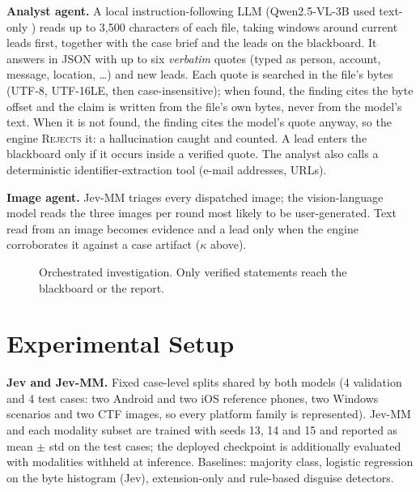 \documentclass[conference]{IEEEtran}
\newcommand{\st}[1]{\textsc{#1}}
\begin{document}
\textbf{Analyst agent.} A local instruction-following LLM (Qwen2.5-VL-3B used text-only \cite{qwen25vl}) reads up to
3{,}500 characters of each file, taking windows around current leads first, together with the case brief and the
leads on the blackboard. It answers in JSON with up to six \emph{verbatim} quotes (typed as person, account, message,
location, \ldots) and new leads. Each quote is searched in the file's bytes (UTF-8, UTF-16LE, then case-insensitive);
when found, the finding cites the byte offset and the claim is written from the file's own bytes, never from the
model's text. When it is not found, the finding cites the model's quote anyway, so the engine \st{Rejects} it: a
hallucination caught and counted. A lead enters the blackboard only if it occurs inside a verified quote. The analyst
also calls a deterministic identifier-extraction tool (e-mail addresses, URLs).

\textbf{Image agent.} Jev-MM triages every dispatched image; the vision-language model reads the three images per
round most likely to be user-generated. Text read from an image becomes evidence and a lead only when the engine
corroborates it against a case artifact ($\kappa$ above).

\begin{figure}[t]
\centering
\small
\setlength{\fboxsep}{3pt}
\caption{Orchestrated investigation. Only verified statements reach the blackboard or the report.}
\label{fig:orch}
\end{figure}

\section{Experimental Setup}
\textbf{Jev and Jev-MM.} Fixed case-level splits shared by both models (4 validation and 4 test cases: two Android and two iOS reference phones, two Windows scenarios and two CTF images, so every platform family is represented). Jev-MM and
each modality subset are trained with seeds 13, 14 and 15 and reported as mean $\pm$ std on the test cases; the
deployed checkpoint is additionally evaluated with modalities withheld at inference. Baselines: majority class,
logistic regression on the byte histogram (Jev), extension-only and rule-based disguise detectors.
\end{document}
